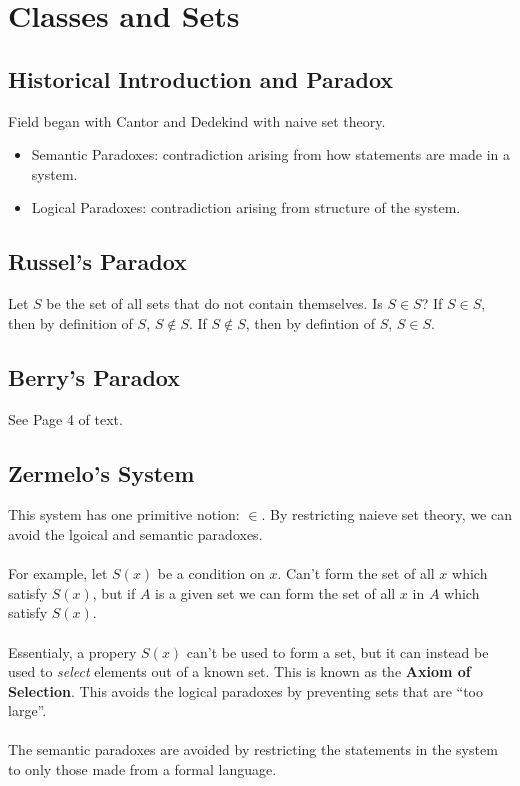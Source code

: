 \documentclass[../base/set_theory.tex]{subfiles}
\begin{document}
\chapter{Classes and Sets}
\section{Historical Introduction and Paradox}
Field began with Cantor and Dedekind with naive set theory.
\begin{itemize}
    \item  Semantic Paradoxes: contradiction arising from how
           statements are made in a system.
    \item  Logical Paradoxes: contradiction arising from structure
           of the system.
\end{itemize}
\section{Russel's Paradox}
Let $S$ be the set of all sets that do not contain themselves.
Is $S \in S$?  If $S \in S$, then by definition of $S$, $S\notin
S$.  If $S \notin S$, then by defintion of $S$, $S \in S$.
\section{Berry's Paradox}
See Page 4 of text.
\section{Zermelo's System}
This system has one primitive notion: $\in$.  By restricting naieve
set theory, we can avoid the lgoical and semantic paradoxes.\\
\\
For example, let $S(x)$ be a condition on $x$.  Can't form the set 
of all $x$ which satisfy $S(x)$, but if $A$ is a given set we can
form the set of all $x$ in $A$ which satisfy $S(x)$.\\
\\
Essentialy, a propery $S(x)$ can't be used to form a set, but it 
can instead be used to \textit{select} elements out of a known set.
This is known as the \textbf{Axiom of Selection}.  This avoids the
logical paradoxes by preventing sets that are ``too large''.\\
\\
The semantic paradoxes are avoided by restricting the statements 
in the system to only those made from a formal language.
\end{document}
